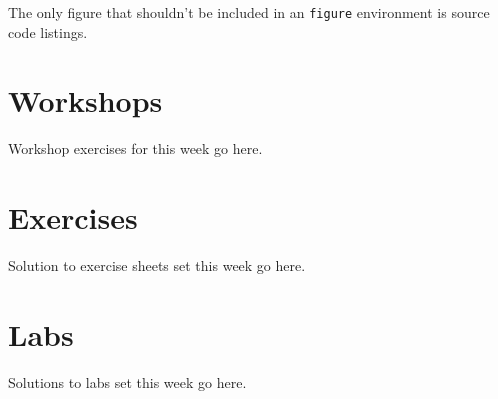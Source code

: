 \documentclass[a4paper,oneside]{report}
\begin{document}
The only figure that shouldn't be included in an \texttt{figure} environment
is source code listings.

\section{Workshops}

Workshop exercises for this week go here.

\section{Exercises}

Solution to exercise sheets set this week go here.

\section{Labs}

Solutions to labs set this week go here.
\end{document}
